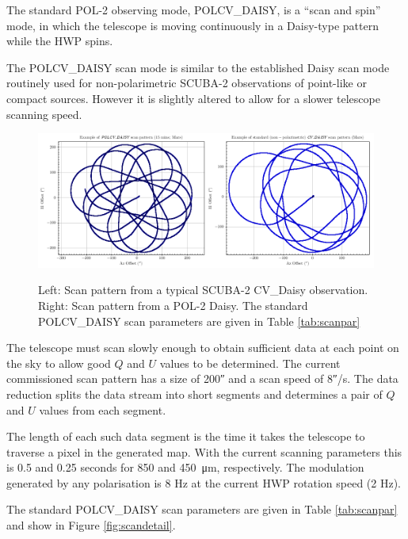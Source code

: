 The standard POL-2 observing mode, POLCV\_DAISY, is a “scan and spin”
mode, in which the telescope is moving continuously in a Daisy-type
pattern while the HWP spins.

The POLCV\_DAISY scan mode is similar to the established Daisy scan
mode routinely used for non-polarimetric SCUBA-2 observations of
point-like or compact sources. However it is slightly altered to allow
for a slower telescope scanning speed.


\begin{figure}[t!]
\begin{center}
\includegraphics[width=0.9\linewidth]{scan_pattern_daisy_comparison.png}
\label{fig:scancompsrison}
\caption [Scan Pattern Comparison]{Left: Scan pattern from a typical
  SCUBA-2 CV\_Daisy observation. Right: Scan pattern from a POL-2
  Daisy. The standard POLCV\_DAISY scan parameters are given in Table
  \ref{tab:scanpar} }
\end{center}
\end{figure}


The telescope must scan slowly enough to obtain sufficient data at
each point on the sky to allow good $Q$ and $U$ values to be
determined. The current commissioned scan pattern has a size of
200\si{\arcsecond} and a scan speed of 8\si{\arcsecond}/s. The data
reduction splits the data stream into short segments and determines a
pair of $Q$ and $U$ values from each segment.

The length of each such data segment is the time it takes the
telescope to traverse a pixel in the generated map. With the current
scanning parameters this is 0.5 and 0.25 seconds for 850 and
\SI{450}{\micro\metre}, respectively. The modulation generated by any
polarisation is 8 Hz at the current HWP rotation speed (2 Hz).

The standard POLCV\_DAISY scan parameters are given in Table
\ref{tab:scanpar} and show in Figure \ref{fig:scandetail}.

